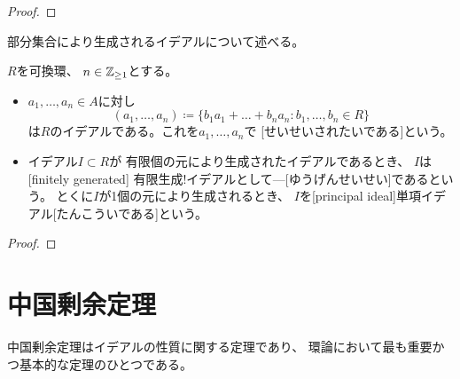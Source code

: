 \documentclass[report]{jlreq}
\begin{document}
\begin{proof}
    \TODO{}
\end{proof}

部分集合により生成されるイデアルについて述べる。

\begin{definition}[生成されたイデアル]
    $R$を可換環、
    $n \in \mathbb{Z}_{\ge 1}$とする。
    \begin{itemize}
        \item $a_1, \dots, a_n \in A$に対し
            \begin{equation}
                (a_1, \dots, a_n) \coloneqq \{
                    b_1 a_1 + \dots + b_n a_n
                    \colon b_1, \dots, b_n \in R
                \}
            \end{equation}
            は$R$のイデアルである。これを$a_1, \dots, a_n$で
            [せいせいされたいである]という。
        \item イデアル$I \subset R$が
            有限個の元により生成されたイデアルであるとき、
            $I$は[finitely generated]
            {有限生成!イデアルとして---}[ゆうげんせいせい]であるという。
            とくに$I$が1個の元により生成されるとき、
            $I$を[principal ideal]{単項イデアル}[たんこういである]という。
    \end{itemize}
\end{definition}

\begin{proposition}[生成されたイデアルの特徴付け]
    \label[proposition]{prop:generated-ideal-characterization}
    \TODO{}
\end{proposition}

\begin{proof}
    \TODO{}
\end{proof}



%
\section{中国剰余定理}

中国剰余定理はイデアルの性質に関する定理であり、
環論において最も重要かつ基本的な定理のひとつである。
\end{document}
